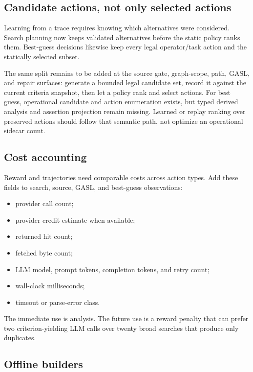\documentclass[11pt]{article}
\newcommand{\code}[1]{\path{#1}}
\begin{document}
\subsection{Candidate actions, not only selected actions}

Learning from a trace requires knowing which alternatives were considered.
Search planning now keeps validated \code{SearchCandidate} alternatives before
the static policy ranks them.  Best-guess decisions likewise keep every legal
operator/task action and the statically selected subset.

The same split remains to be added at the source gate, graph-scope, path, GASL,
and repair surfaces: generate a bounded legal candidate set, record it against
the current criteria snapshot, then let a policy rank and select actions.  For
best guess, operational candidate and action enumeration exists, but typed
derived analysis and assertion projection remain missing.  Learned or replay
ranking over preserved actions should follow that semantic path, not optimize
an operational sidecar count.

\subsection{Cost accounting}

Reward and trajectories need comparable costs across action types.  Add these
fields to search, source, GASL, and best-guess observations:

\begin{itemize}
  \item provider call count;
  \item provider credit estimate when available;
  \item returned hit count;
  \item fetched byte count;
  \item LLM model, prompt tokens, completion tokens, and retry count;
  \item wall-clock milliseconds;
  \item timeout or parse-error class.
\end{itemize}

The immediate use is analysis.  The future use is a reward penalty that can
prefer two criterion-yielding LLM calls over twenty broad searches that produce
only duplicates.

\subsection{Offline builders}
\end{document}
